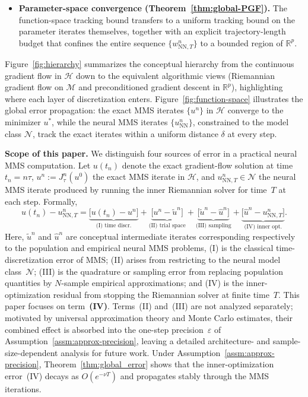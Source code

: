 \documentclass[twoside,11pt]{article}
\newcommand{\rev}[1]{#1}                           %
\newcommand{\R}{\mathbb{R}}
\newcommand{\NN}{\mathrm{NN}}
\newcommand{\calH}{\mathcal{H}}
\newcommand{\calM}{\mathcal{M}}
\newcommand{\calN}{\mathcal{N}}
\begin{document}
\begin{itemize}
  \item \textbf{Parameter-space convergence (Theorem~\ref{thm:global-PGF}).}
  The function-space tracking bound transfers to a uniform tracking bound on the parameter iterates themselves, together with an explicit trajectory-length budget that confines the entire sequence $\{w^n_{\NN,T}\}$ to a bounded region of $\R^p$.
\end{itemize}

\rev{%
Figure~\ref{fig:hierarchy} summarizes the conceptual hierarchy from the continuous gradient flow in $\calH$ down to the equivalent algorithmic views (Riemannian gradient flow on $\calM$ and preconditioned gradient descent in $\mathbb{R}^p$), highlighting where each layer of discretization enters.
Figure~\ref{fig:function-space} illustrates the global error propagation: the exact MMS iterates $\{u^n\}$ in $\calH$ converge to the minimizer $u^*$, while the neural MMS iterates $\{u^n_{\mathrm{NN}}\}$, constrained to the model class $\calN$, track the exact iterates within a uniform distance $\delta$ at every step.
}


\noindent\textbf{Scope of this paper.}
We distinguish four sources of error in a practical neural MMS computation.
Let $u(t_n)$ denote the exact gradient-flow solution at time $t_n = n\tau$,
$u^n := J_\tau^n(u^0)$ the exact MMS iterate in $\calH$,
and $u^n_{\NN,T}\in\calN$ the neural MMS iterate produced by running the
inner Riemannian solver for time~$T$ at each step.
Formally,
\begin{equation}\label{eq:intro:full-error-decomp}
u(t_n)-u^n_{\NN,T}
=
\underbrace{\bigl[u(t_n)-u^n\bigr]}_{\text{(I) time discr.}}
+
\underbrace{\bigl[u^n-\tilde u^n\bigr]}_{\text{(II) trial space}}
+
\underbrace{\bigl[\tilde u^n-\hat u^n\bigr]}_{\text{(III) sampling}}
+
\underbrace{\bigl[\hat u^n-u^n_{\NN,T}\bigr]}_{\text{(IV) inner opt.}}.
\end{equation}
Here, $\tilde u^n$ and $\hat u^n$ are conceptual intermediate iterates
corresponding respectively to the population and empirical neural MMS problems, (I) is the classical time-discretization error of MMS;
(II) arises from restricting to the neural model class~$\calN$;
(III) is the quadrature or sampling error from replacing population quantities
by $N$-sample empirical approximations;
and (IV) is the inner-optimization residual from stopping the Riemannian
solver at finite time~$T$.
This paper focuses on term~\textbf{(IV)}.
Terms~(II) and~(III) are not analyzed separately; motivated by universal
approximation theory and Monte Carlo estimates, their combined effect is
absorbed into the one-step precision~$\varepsilon$ of
Assumption~\ref{assm:approx-precision}, leaving a detailed
architecture- and sample-size-dependent analysis for future work.
Under Assumption~\ref{assm:approx-precision}, Theorem~\ref{thm:global_error}
shows that the inner-optimization error~(IV) decays as $O(e^{-\nu T})$ and
propagates stably through the MMS iterations.
\end{document}
